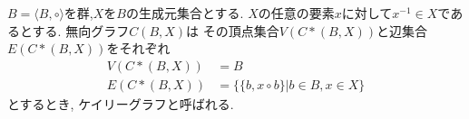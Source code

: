 \documentclass[specialreport]{subfiles}
\begin{document}
\begin{defi}
$B = \langle B,\circ\rangle$を群,$X$を$B$の生成元集合とする. 
$X$の任意の要素$x$に対して$x^{-1}\in X$であるとする. 無向グラフ$C(B,X)$は
その頂点集合$V(C*(B,X))$と辺集合$E(C*(B,X))$をそれぞれ
\begin{equation*} 
	\begin{split}
	V(C*(B,X)) &= B \\
	E(C*(B,X)) &= \{\{b,x\circ b\}| b \in B, x \in X\} 
	\end{split}
\end{equation*}
とするとき, ケイリーグラフと呼ばれる.
\end{defi}
\end{document}
